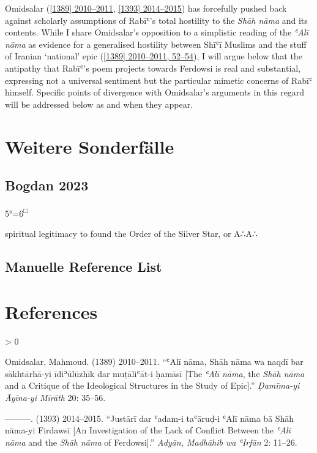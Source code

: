 \documentclass[
  english,
  a4paper,
  DIV=12,
  footlines=2.1,
  usegeometry=true]{scrartcl}
\newlength{\cslhangindent}
\newenvironment{CSLReferences}[2] %
 {%
  \setlength{\parindent}{0pt}
  \ifodd #1 \everypar{\setlength{\hangindent}{\cslhangindent}}\ignorespaces\fi
  \ifnum #2 > 0
  \setlength{\parskip}{#2\baselineskip}
  \fi
 }%
 {}
\begin{document}
\leavevmode\marginpar{\textcolor{parnum}{{[}35{]}}}Omidsalar
(\protect\hyperlink{ref-omidsalar_ali_2010}{{[}1389{]} 2010--2011},
\protect\hyperlink{ref-omidsalar_justari_2014}{{[}1393{]} 2014--2015})
has forcefully pushed back against scholarly assumptions of Rabīʿ's
total hostility to the \emph{Shāh nāma} and its contents. While I share
Omidsalar's opposition to a simplistic reading of the \emph{ʿAlī nāma}
as evidence for a generalised hostility between Shīʿī Muslims and the
stuff of Iranian `national' epic
(\protect\hyperlink{ref-omidsalar_ali_2010}{{[}1389{]} 2010--2011,
52--54}), I will argue below that the antipathy that Rabīʿ's poem
projects towards Ferdowsi is real and substantial, expressing not a
universal sentiment but the particular mimetic concerns of Rabīʿ
himself. Specific points of divergence with Omidsalar's arguments in
this regard will be addressed below as and when they appear.

\hypertarget{weitere-sonderfuxe4lle}{%
\section{Weitere Sonderfälle}\label{weitere-sonderfuxe4lle}}

\hypertarget{bogdan-2023}{%
\subsection{Bogdan 2023}\label{bogdan-2023}}

\leavevmode\marginpar{\textcolor{parnum}{{[}36{]}}}5°=6\textsuperscript{□}

\leavevmode\marginpar{\textcolor{parnum}{{[}37{]}}}spiritual legitimacy
to found the Order of the Silver Star, or A∴A∴

\hypertarget{manuelle-reference-list}{%
\subsection{Manuelle Reference List}\label{manuelle-reference-list}}

\hypertarget{bibliography}{%
\section*{References}\label{bibliography}}

\hypertarget{refs}{}
\begin{CSLReferences}{1}{0}
\leavevmode{}%
Omidsalar, Mahmoud. (1389) 2010--2011. {``ʿAlī nāma, Shāh nāma wa naqdī
bar sākhtārhā-yi īdiʾūlūzhīk dar muṭāliʿāt-i ḥamāsī {[}The \emph{ʿAlī
nāma}, the \emph{Shāh nāma} and a Critique of the Ideological Structures
in the Study of Epic{]}.''} \emph{Ḍamīma-yi Āyīna-yi Mīrāth} 20: 35--56.

\leavevmode{}%
---------. (1393) 2014--2015. {``Justārī dar ʿadam-i taʿāruḍ-i ʿAlī nāma
bā Shāh nāma-yi Firdawsī {[}An Investigation of the Lack of Conflict
Between the \emph{ʿAlī nāma} and the \emph{Shāh nāma} of Ferdowsi{]}.''}
\emph{Adyān, Madhāhib wa ʿIrfān} 2: 11--26.

\end{CSLReferences}
\end{document}
